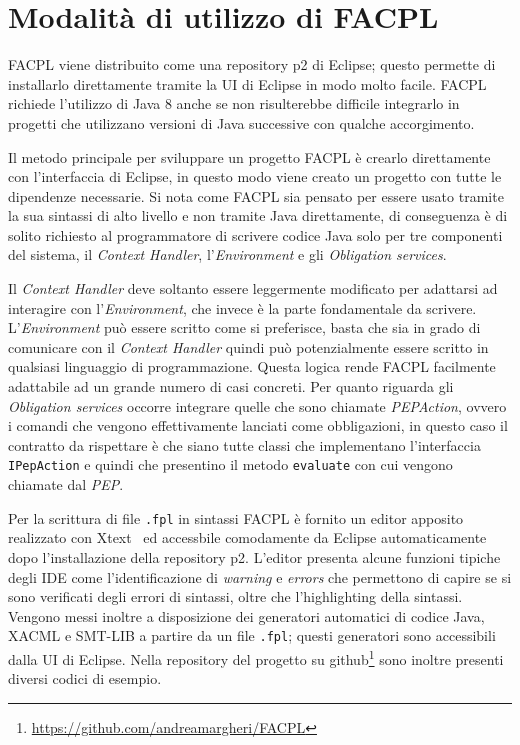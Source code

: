 \section{Modalità di utilizzo di FACPL}
\label{sec:modalitaFACPL}
FACPL viene distribuito come una repository p2 di Eclipse; questo permette di installarlo direttamente tramite la UI di Eclipse in modo molto facile. FACPL richiede l'utilizzo di Java 8 anche se non risulterebbe difficile integrarlo in progetti che utilizzano versioni di Java successive con qualche accorgimento.\par
Il metodo principale per sviluppare un progetto FACPL è crearlo direttamente con l'interfaccia di Eclipse, in questo modo viene creato un progetto con tutte le dipendenze necessarie. Si nota come FACPL sia pensato per essere usato tramite la sua sintassi di alto livello e non tramite Java direttamente, di conseguenza è di solito richiesto al programmatore di scrivere codice Java solo per tre componenti del sistema, il \emph{Context Handler}, l'\emph{Environment} e gli \emph{Obligation services}.\par
Il \emph{Context Handler} deve soltanto essere leggermente modificato per adattarsi ad interagire con l'\emph{Environment}, che invece è la parte fondamentale da scrivere. L'\emph{Environment} può essere scritto come si preferisce, basta che sia in grado di comunicare con il \emph{Context Handler} quindi può potenzialmente essere scritto in qualsiasi linguaggio di programmazione. Questa logica rende FACPL facilmente adattabile ad un grande numero di casi concreti. Per quanto riguarda gli \emph{Obligation services} occorre integrare quelle che sono chiamate \emph{PEPAction}, ovvero i comandi che vengono effettivamente lanciati come obbligazioni, in questo caso il contratto da rispettare è che siano tutte classi che implementano l'interfaccia \texttt{IPepAction} e quindi che presentino il metodo \texttt{evaluate} con cui vengono chiamate dal \emph{PEP}.\par
Per la scrittura di file \texttt{.fpl} in sintassi FACPL è fornito un editor apposito realizzato con Xtext~\cite{eclipseXtext} ed accessbile comodamente da Eclipse automaticamente dopo l'installazione della repository p2. L'editor presenta alcune funzioni tipiche degli IDE come l'identificazione di \emph{warning} e \emph{errors} che permettono di capire se si sono verificati degli errori di sintassi, oltre che l'highlighting della sintassi. Vengono messi inoltre a disposizione dei generatori automatici di codice Java, XACML e SMT-LIB a partire da un file \texttt{.fpl}; questi generatori sono accessibili dalla UI di Eclipse. Nella repository del progetto su github\footnote{\url{https://github.com/andreamargheri/FACPL}} sono inoltre presenti diversi codici di esempio.\par

